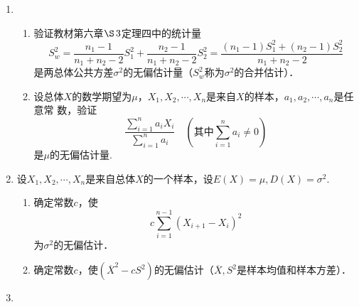 \documentclass[10pt,a4paper]{article}
\begin{document}
\begin{enumerate}
    \item \begin{enumerate}
        \item 验证教材第六章$\S\, 3$定理四中的统计量
        $$S_w^2=\frac{n_1-1}{n_1+n_2-2}S_1^2+\frac{n_2-1}{n_1+n_2-2}S_2^2=\frac{(n_1-1)S_1^2+(n_2-1)S_2^2}{n_1+n_2-2}$$
        是两总体公共方差$\sigma^2$的无偏估计量（$S_w^2$称为$\sigma^2$的合并估计）．
        \item 设总体$X$的数学期望为$\mu$，$X_1,X_2,\cdots,X_n$是来自$X$的样本，$a_1,a_2,\cdots,a_n$是任意常
        数，验证
        $$\frac{\displaystyle{\sum_{i=1}^n a_i X_i}}{\displaystyle{\sum _{i=1}^n a_i}}\quad(\mbox{其中}\sum_{i=1}^n a_i \neq 0)$$
        是$\mu$的无偏估计量.
    \end{enumerate}



    \item 设$X_1,X_2,\cdots,X_n$是来自总体$X$的一个样本，设$E(X)=\mu,D(X)=\sigma^2$.
    \begin{enumerate}
        \item 确定常数$c$，使$$c\sum_{i=1}^{n-1}(X_{i+1}-X_i)^2$$为$\sigma^2$的无偏估计．
        \item 确定常数$c$，使$(\overline{X}^2-cS^2)$的无偏估计（$\overline{X},S^2$是样本均值和样本方差）．
    \end{enumerate}



    \item 
    


  

\end{enumerate}
\end{document}
